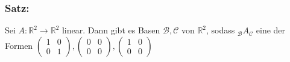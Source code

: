 \subsubsection{Satz:}
Sei $A: \mathbb{R}^{2} \rightarrow \mathbb{R}^{2}$ linear. Dann gibt es Basen $\mathcal{B}, \mathcal{C}$ von $\mathbb{R}^{2}$, sodass $_{\mathcal{B}}A_{\mathcal{C}}$ eine der Formen $\begin{pmatrix} 1 & 0 \\ 0 & 1 \end{pmatrix}, \begin{pmatrix} 0 & 0 \\ 0 & 0 \end{pmatrix}, \begin{pmatrix} 1 & 0 \\ 0 & 0 \end{pmatrix}$
%
%
%
